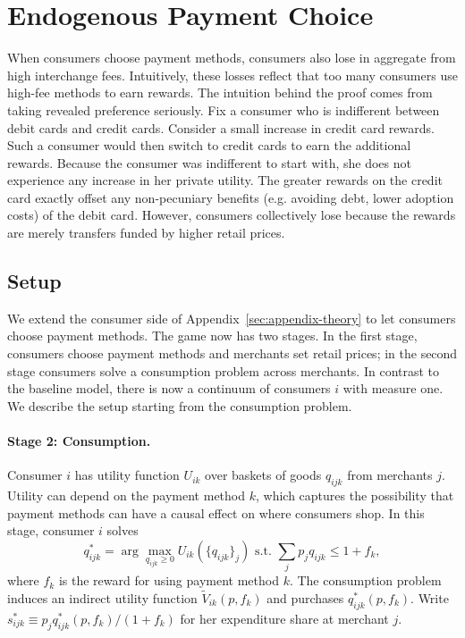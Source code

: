 \documentclass[main.tex]{subfiles}
\begin{document}
\section{Endogenous Payment Choice}\label{sec:appendix-endogenous-choice}

When consumers choose payment methods, consumers also lose in aggregate from high interchange fees.
Intuitively, these losses reflect that too many consumers use high-fee methods to earn rewards.
The intuition behind the proof comes from taking revealed preference seriously.
Fix a consumer who is indifferent between debit cards and credit cards.
Consider a small increase in credit card rewards.
Such a consumer would then switch to credit cards to earn the additional rewards.
Because the consumer was indifferent to start with, she does not experience any increase in her private utility.
The greater rewards on the credit card exactly offset any non-pecuniary benefits (e.g. avoiding debt, lower adoption costs) of the debit card.
However, consumers collectively lose because the rewards are merely transfers funded by higher retail prices.

\subsection{Setup}\label{subsec:endo-setup}

We extend the consumer side of Appendix~\ref{sec:appendix-theory} to let consumers choose payment methods.
The game now has two stages.
In the first stage, consumers choose payment methods and merchants set retail prices; in the second stage consumers solve a consumption problem across merchants.
In contrast to the baseline model, there is now a continuum of consumers $i$ with measure one.
We describe the setup starting from the consumption problem.

\paragraph{Stage 2: Consumption.}
Consumer $i$ has utility function $U_{ik}$ over baskets of goods $q_{ijk}$ from merchants $j$.
Utility can depend on the payment method $k$, which captures the possibility that payment methods can have a causal effect on where consumers shop.
In this stage, consumer $i$ solves
\[
q^*_{ijk} = \arg\max_{q_{ijk}\geq 0} U_{ik}\left(\{q_{ijk}\}_{j}\right) \text{ s.t. } \sum_j p_j q_{ijk} \leq 1 + f_k,
\]
where $f_k$ is the reward for using payment method $k$.
The consumption problem induces an indirect utility function $\widetilde V_{ik}(p,f_k)$ and purchases $q^*_{ijk}(p,f_k)$.
Write $s^*_{ijk}\equiv p_j q^*_{ijk}(p,f_k)/(1+f_k)$ for her expenditure share at merchant $j$.
\end{document}
